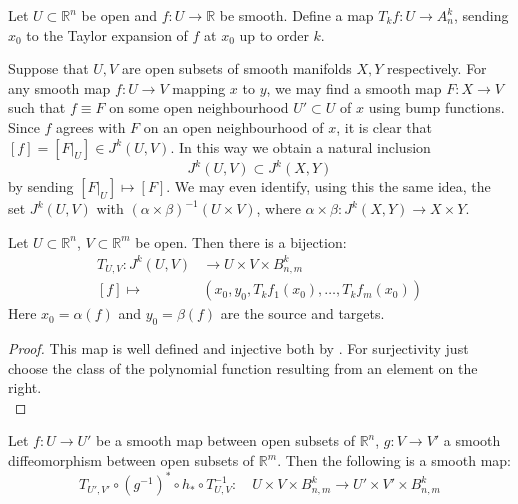 \documentclass[12pt]{article}
\newcommand{\RR}{\mathbb{R}}
\begin{document}
Let $U \subset \RR^n$ be open and $f: U \to \RR$ be smooth. Define a map $T_kf: U \to A_n^k$, sending $x_0$ to the Taylor expansion of $f$ at $x_0$ up to order $k$.

\begin{remark}
    Suppose that $U, V$ are open subsets of smooth manifolds $X, Y$ respectively. For any smooth map $f: U \to V$ mapping $x$ to $y$, we may find a smooth map $F: X \to V$ such that $f \equiv F$ on some open neighbourhood $U' \subset U$ of $x$ using bump functions. Since $f$ agrees with $F$ on an open neighbourhood of $x$, it is clear that $[f] = [F|_{U}] \in J^k(U, V)$. In this way we obtain a natural inclusion 
    $$
    J^k(U, V) \subset J^k(X, Y)
    $$
    by sending $[F|_{U}] \mapsto [F]$. We may even identify, using this the same idea, the set $J^k(U, V)$ with $(\alpha \times \beta)^{-1} (U\times V)$, where $\alpha\times \beta: J^k(X, Y) \to X\times Y$. \\
\end{remark}

\begin{proposition}
    Let $U\subset \RR^n$, $V\subset \RR^m$ be open. Then there is a bijection: 
    \begin{align*}
        T_{U, V}: J^k(U, V) & \to U \times V \times B_{n, m}^k \\ 
        [f]  \longmapsto & (x_0, y_0, T_k f_1(x_0), \dots, T_k f_m(x_0) )
    \end{align*}
    Here $x_0 = \alpha(f)$ and $y_0 = \beta(f)$ are the source and targets. 
\end{proposition}

\begin{proof}
    This map is well defined and injective both by . For surjectivity just choose the class of the polynomial function resulting from an element on the right. \\
\end{proof}


\begin{lemma} \label{convoluted but smooth}
    Let $f: U \to U'$ be a smooth map between open subsets of $\RR^n$, $g: V \to V'$ a smooth diffeomorphism between open subsets of $\RR^m$. Then the following is a smooth map: 
    $$
    T_{U', V'} \circ (g^{-1})^* \circ h_* \circ T_{U, V}^{-1}: \quad U\times V \times B_{n, m}^k \longrightarrow U'\times V' \times B_{n, m}^k
    $$
\end{lemma}
\end{document}
